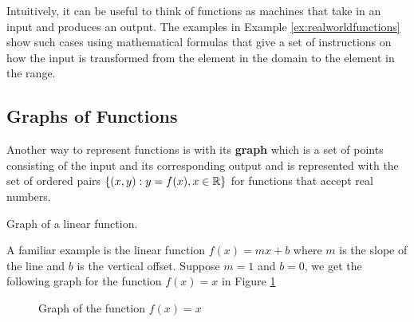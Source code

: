 Intuitively, it can be useful to think of functions as machines that take in an input and produces an output. The examples in Example \ref{ex:realworldfunctions} show such cases using mathematical formulas that give a set of instructions on how the input is transformed from the element in the domain to the element in the range.

\subsection{Graphs of Functions}\label{sect:graphs of functions}

Another way to represent functions is with its \textbf{graph} which is a set of points consisting of the input and its corresponding output and is represented with the set of ordered pairs $\{(x,y) : y = f(x), x\in\mathbb{R}\}$ for functions that accept real numbers.

\begin{example} Graph of a linear function.

    A familiar example is the linear function $f(x) = mx + b$ where $m$ is the slope of the line and $b$ is the vertical offset. Suppose $m = 1$ and $b = 0$, we get the following graph for the function $f(x) = x$ in Figure \ref{f(x)=x graph}
    \begin{figure}[!ht]
        \centering
        \label{f(x)=x graph}
        \caption{Graph of the function $f(x) = x$}
    \end{figure}
\end{example}

